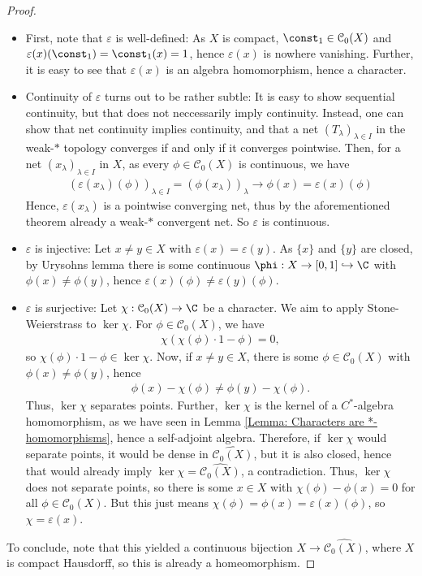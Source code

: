 \documentclass[american]{scrartcl}
\newcommand{\cC}{\mathcal{C}}
\newcommand{\eps}{\varepsilon}
\newcommand{\into}{\hookrightarrow}
\begin{document}
\begin{proof}
	\leavevmode
	\begin{itemize}
		\item First, note that $\eps$ is well-defined: As $X$ is compact, $\const_1\in \cC_0(X)$ and $\eps(x)(\const_1)=\const_1(x)=1$, hence $\eps(x)$ is nowhere vanishing. Further, it is easy to see that $\eps(x)$ is an algebra homomorphism, hence a character.
		\item Continuity of $\eps$ turns out to be rather subtle: It is easy to show sequential continuity, but that does not neccessarily imply continuity. Instead, one can show that net continuity implies continuity, and that a net $(T_\lambda)_{\lambda\in I}$ in the weak-$*$ topology converges if and only if it converges pointwise. Then, for a net $(x_\lambda)_{\lambda\in I}$ in $X$, as every $\phi\in \cC_0(X)$ is continuous, we have
		\begin{align*}
			(\eps(x_\lambda)(\phi))_{\lambda\in I}=(\phi(x_\lambda))_{\lambda}\to \phi(x)=\eps(x)(\phi)
		\end{align*}
		Hence, $\eps(x_\lambda)$ is a pointwise converging net, thus by the aforementioned theorem already a weak-$*$ convergent net. So $\eps$ is continuous.
		\item $\eps$ is injective: Let $x\neq y\in X$ with $\eps(x)=\eps(y)$. As $\{x\}$ and $\{y\}$ are closed, by Urysohns lemma there is some continuous $\phi:X\to [0,1]\into \C$ with $\phi(x)\neq \phi(y)$, hence $\eps(x)(\phi)\neq \eps(y)(\phi)$.
		\item $\eps$ is surjective: Let $\chi:\cC_0(X)\to \C$ be a character. We aim to apply Stone-Weierstrass to $\ker\chi$. For $\phi\in \cC_0(X)$, we have 
		\begin{align*}
			\chi(\chi(\phi)\cdot 1-\phi)=0,
		\end{align*}
		so $\chi(\phi)\cdot 1-\phi\in \ker \chi$. Now, if $x\neq y\in X$, there is some $\phi\in \cC_0(X)$ with $\phi(x)\neq \phi(y)$, hence
		\begin{align*}
			\phi(x)-\chi(\phi)\neq \phi(y)-\chi(\phi).
		\end{align*}
		Thus, $\ker \chi$ separates points. Further, $\ker \chi$ is the kernel of a $C^*$-algebra homomorphism, as we have seen in Lemma \ref{Lemma: Characters are *-homomorphisms}, hence a self-adjoint algebra. Therefore, if $\ker \chi$ would separate points, it would be dense in $\widehat{\cC_0(X)}$, but it is also closed, hence that would already imply $\ker \chi=\widehat{\cC_0(X)}$, a contradiction. Thus, $\ker\chi$ does not separate points, so there is some $x\in X$ with $\chi(\phi)-\phi(x)=0$ for all $\phi\in\cC_0(X)$. But this just means $\chi(\phi)=\phi(x)=\eps(x)(\phi)$, so $\chi=\eps(x)$.
	\end{itemize}
	To conclude, note that this yielded a continuous bijection $X\to\widehat{\cC_0(X)}$, where $X$ is compact Hausdorff, so this is already a homeomorphism.
\end{proof}
\end{document}

